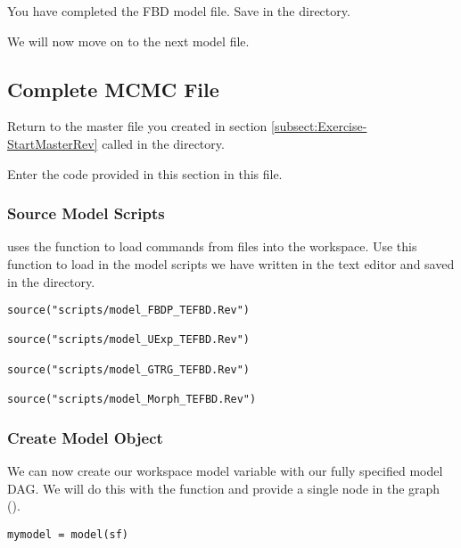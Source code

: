{\begin{framed}
You have completed the FBD model file. Save  in the  directory.

We will now move on to the next model file.
\end{framed}}

\bigskip

\subsection{Complete MCMC File}\label{subsect:Exercise-CompleteMCMC}

{\begin{framed}
Return to the master \Rev file you created in section \ref{subsect:Exercise-StartMasterRev} called {\textcolor{red}{}} in the  directory.

Enter the \Rev code provided in this section in this file.
\end{framed}}

\medskip
\subsubsection{Source Model Scripts}\label{subsub:Exercise-SourceMods}

\RevBayes uses the  function to load commands from \Rev files into the workspace.
Use this function to load in the model scripts we have written in the text editor and saved in the  directory.
{\tt \begin{snugshade*}
\begin{lstlisting}
source("scripts/model_FBDP_TEFBD.Rev")

source("scripts/model_UExp_TEFBD.Rev")

source("scripts/model_GTRG_TEFBD.Rev")

source("scripts/model_Morph_TEFBD.Rev")
\end{lstlisting}
\end{snugshade*}}


\medskip
\subsubsection{Create Model Object}\label{subsub:Exercise-ModObj}

We can now create our workspace model variable with our fully specified model DAG. 
We will do this with the  function and provide a single node in the graph ().
{\tt \begin{snugshade*}
\begin{lstlisting}
mymodel = model(sf)
\end{lstlisting}
\end{snugshade*}}

